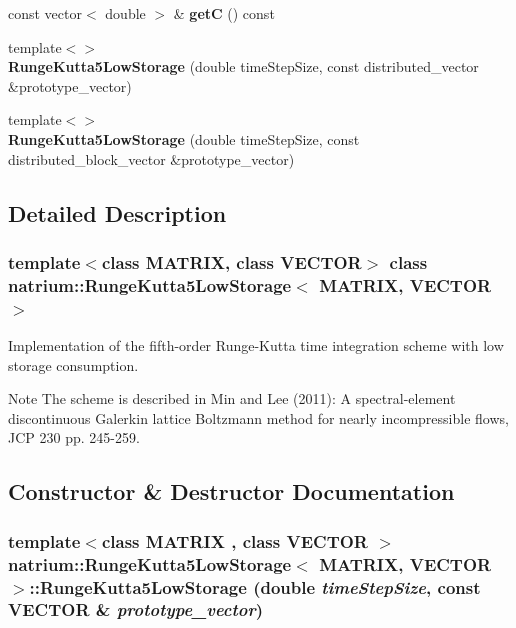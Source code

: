 \begin{DoxyCompactItemize}
\item 
\hypertarget{classnatrium_1_1RungeKutta5LowStorage_a0b747cec432de72544b82b5033eb8211}{
const vector$<$ double $>$ \& {\bfseries getC} () const }
\label{classnatrium_1_1RungeKutta5LowStorage_a0b747cec432de72544b82b5033eb8211}

\item 
\hypertarget{classnatrium_1_1RungeKutta5LowStorage_a226065b21bd5f8e3ae7566ba53e33d1e}{
{\footnotesize template$<$$>$ }\\{\bfseries RungeKutta5LowStorage} (double timeStepSize, const distributed\_\-vector \&prototype\_\-vector)}
\label{classnatrium_1_1RungeKutta5LowStorage_a226065b21bd5f8e3ae7566ba53e33d1e}

\item 
\hypertarget{classnatrium_1_1RungeKutta5LowStorage_ae5c62f8f59075a950ff25719e79d6fab}{
{\footnotesize template$<$$>$ }\\{\bfseries RungeKutta5LowStorage} (double timeStepSize, const distributed\_\-block\_\-vector \&prototype\_\-vector)}
\label{classnatrium_1_1RungeKutta5LowStorage_ae5c62f8f59075a950ff25719e79d6fab}

\end{DoxyCompactItemize}


\subsection{Detailed Description}
\subsubsection*{template$<$class MATRIX, class VECTOR$>$ class natrium::RungeKutta5LowStorage$<$ MATRIX, VECTOR $>$}

Implementation of the fifth-\/order Runge-\/Kutta time integration scheme with low storage consumption. \begin{DoxyNote}{Note}
The scheme is described in Min and Lee (2011): A spectral-\/element discontinuous Galerkin lattice Boltzmann method for nearly incompressible flows, JCP 230 pp. 245-\/259. 
\end{DoxyNote}


\subsection{Constructor \& Destructor Documentation}
\hypertarget{classnatrium_1_1RungeKutta5LowStorage_a1f879ee900db9ac82ddd12820e7b703d}{
\subsubsection[{RungeKutta5LowStorage}]{\setlength{\rightskip}{0pt plus 5cm}template$<$class MATRIX , class VECTOR $>$ {\bf natrium::RungeKutta5LowStorage}$<$ MATRIX, VECTOR $>$::{\bf RungeKutta5LowStorage} (double {\em timeStepSize}, \/  const VECTOR \& {\em prototype\_\-vector})}}
\label{classnatrium_1_1RungeKutta5LowStorage_a1f879ee900db9ac82ddd12820e7b703d}


